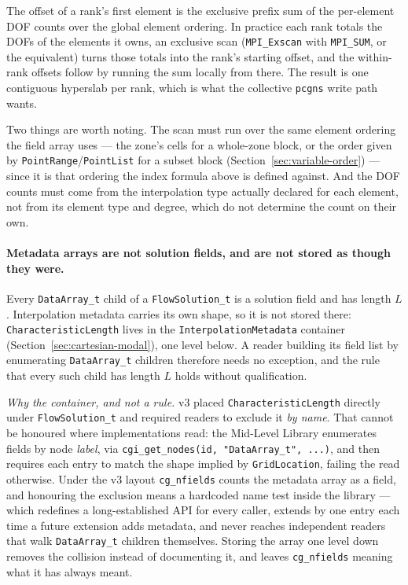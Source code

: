 \documentclass[11pt,letterpaper]{article}
\newif\ifvfourdraft
\newcommand{\vfourmark}{\ifvfourdraft\textcolor{v4violet}{\textbf{[v4]}}\ \fi}
\begin{document}
The offset of a rank's first element is the exclusive prefix sum of the
per-element DOF counts over the global element ordering.  In practice each rank
totals the DOFs of the elements it owns, an exclusive scan
(\texttt{MPI\_Exscan} with \texttt{MPI\_SUM}, or the equivalent) turns those
totals into the rank's starting offset, and the within-rank offsets follow by
running the sum locally from there.  The result is one contiguous hyperslab per
rank, which is what the collective \texttt{pcgns} write path wants.

Two things are worth noting.  The scan must run over the same element ordering
the field array uses --- the zone's cells for a whole-zone block, or the order
given by \texttt{PointRange}/\texttt{PointList} for a subset block
(Section~\ref{sec:variable-order}) --- since it is that ordering the index
formula above is defined against.  And the DOF counts must come from the
interpolation type actually declared for each element, not from its element type
and degree, which do not determine the count on their own.

\paragraph{\vfourmark Metadata arrays are not solution fields, and are not stored
as though they were.}
Every \texttt{DataArray\_t} child of a \texttt{FlowSolution\_t} is a solution field
and has length $L$.  Interpolation metadata carries its own shape, so it is not
stored there: \texttt{CharacteristicLength} lives in the
\texttt{InterpolationMetadata} container (Section~\ref{sec:cartesian-modal}), one
level below.  A reader building its field list by enumerating
\texttt{DataArray\_t} children therefore needs no exception, and the rule that
every such child has length $L$ holds without qualification.

\smallskip
\noindent\textit{Why the container, and not a rule.}  v3 placed
\texttt{CharacteristicLength} directly under \texttt{FlowSolution\_t} and required
readers to exclude it \emph{by name}.  That cannot be honoured where
implementations read: the Mid-Level Library enumerates fields by node \emph{label},
via \texttt{cgi\_get\_nodes(id, "DataArray\_t", ...)}, and then requires each entry
to match the shape implied by \texttt{GridLocation}, failing the read otherwise.
Under the v3 layout \texttt{cg\_nfields} counts the metadata array as a field, and
honouring the exclusion means a hardcoded name test inside the library --- which
redefines a long-established API for every caller, extends by one entry each time a
future extension adds metadata, and never reaches independent readers that walk
\texttt{DataArray\_t} children themselves.  Storing the array one level down
removes the collision instead of documenting it, and leaves \texttt{cg\_nfields}
meaning what it has always meant.
\end{document}
